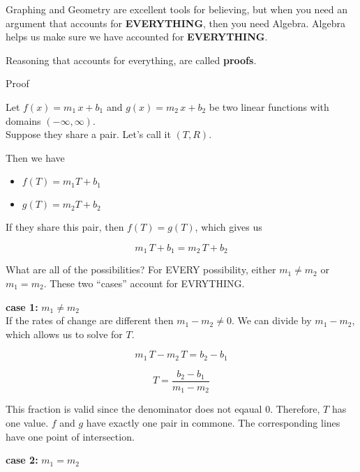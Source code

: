 \documentclass{ximera}
\begin{document}
Graphing and Geometry are excellent tools for believing, but when you need an argument that accounts for \textbf{\textcolor{purple!85!blue}{EVERYTHING}}, then you need Algebra.  Algebra helps us make sure we have accounted for \textbf{\textcolor{purple!85!blue}{EVERYTHING}}.  



Reasoning that accounts for everything, are called \textbf{proofs}.














\begin{explanation} Proof 


Let $f(x) = m_1 \, x + b_1$ and $g(x) = m_2 \, x + b_2$ be two linear functions with domains $(-\infty, \infty)$. \\
Suppose they share a pair. Let's call it $(T, R)$.

Then we have 

\begin{itemize}
\item $f(T) = m_1 T + b_1$
\item $g(T) = m_2 T + b_2$
\end{itemize}

If they share this pair, then $f(T) = g(T)$, which gives us

\[     m_1 \, T + b_1 =  m_2 \, T + b_2  \]


What are all of the possibilities?  For EVERY possibility, either $m_1 \ne m_2$ or $m_1 = m_2$.  These two ``cases'' account for EVRYTHING.


\textbf{case 1:}  $m_1 \ne m_2$ \\

If the rates of change are different then  $m_1 - m_2 \ne 0$.  We can divide by $m_1 - m_2$, which allows us to solve for $T$.

\[     m_1 \, T - m_2 \, T =  b_2 -b_1 \]


\[     T =  \frac{b_2 -b_1}{m_1 - m_2}  \]

This fraction is valid since the denominator does not eqaual $0$.  Therefore, $T$ has one value.  $f$ and $g$ have exactly one pair in commone.  The corresponding lines have one point of intersection.



\textbf{case 2:}  $m_1 = m_2$ \\




\end{explanation}
\end{document}
